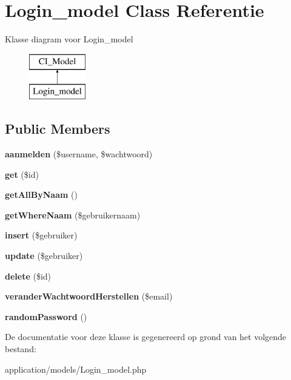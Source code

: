 \hypertarget{class_login__model}{}\section{Login\+\_\+model Class Referentie}
\label{class_login__model}
Klasse diagram voor Login\+\_\+model\begin{figure}[H]
\begin{center}
\leavevmode
\includegraphics[height=2.000000cm]{class_login__model}
\end{center}
\end{figure}
\subsection*{Public Members}
\begin{DoxyCompactItemize}
\item 
\mbox{\label{class_login__model_a060e394d781c0cafd27acdb6a4d43e8e}} 
{\bfseries aanmelden} (\$username, \$wachtwoord)
\item 
\mbox{\label{class_login__model_a50e3bfb586b2f42932a6a93f3fbb0828}} 
{\bfseries get} (\$id)
\item 
\mbox{\label{class_login__model_a2b035b1ffd1cbe651b35bb3e53d72c09}} 
{\bfseries get\+All\+By\+Naam} ()
\item 
\mbox{\label{class_login__model_ab883fc4976ed21233f45abc518858832}} 
{\bfseries get\+Where\+Naam} (\$gebruikernaam)
\item 
\mbox{\label{class_login__model_ad3bba628994625205bf26ae119716c22}} 
{\bfseries insert} (\$gebruiker)
\item 
\mbox{\label{class_login__model_ae3e552ba8d345132349739b6be738e4e}} 
{\bfseries update} (\$gebruiker)
\item 
\mbox{\label{class_login__model_a2f8258add505482d7f00ea26493a5723}} 
{\bfseries delete} (\$id)
\item 
\mbox{\label{class_login__model_a346180f1629d703b7a3d5260675fdc5a}} 
{\bfseries verander\+Wachtwoord\+Herstellen} (\$email)
\item 
\mbox{\label{class_login__model_a2b3eb99abe1db9d544f66e2a32168f19}} 
{\bfseries random\+Password} ()
\end{DoxyCompactItemize}


De documentatie voor deze klasse is gegenereerd op grond van het volgende bestand\+:\begin{DoxyCompactItemize}
\item 
application/models/Login\+\_\+model.\+php\end{DoxyCompactItemize}
